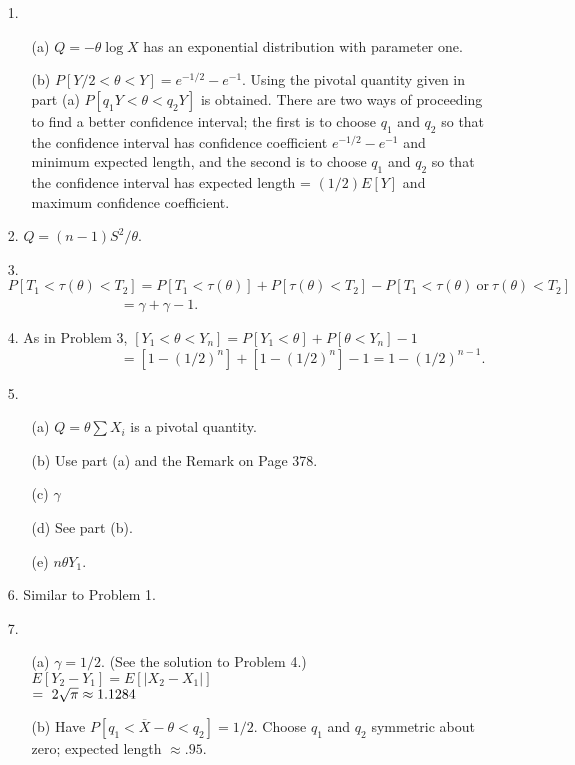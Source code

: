 \begin{enumerate}
	\item[1.] \begin{enumerate}
		\item[(a)] $Q=-\theta\log X$ has an exponential distribution with parameter one.
		\item[(b)] $P[Y/2 <\theta <Y] = e^{-1/2}-e^{-1}$. Using the pivotal quantity given in part (a) $P[q_1Y < \theta < q_2Y]$ is obtained.  There are two ways of proceeding to find a better confidence interval; the first is to choose $q_1$ and $q_2$ so that the confidence interval has confidence coefficient $e^{-1/2}-e^{-1}$ and minimum expected length, and the second is to choose $q_1$ and $q_2$ so that the confidence interval has expected length = $(1/2)E[Y]$ and maximum confidence coefficient.
	\end{enumerate}
	
	\item[2.] $Q=(n-1)S^2/\theta$.
	
	\item[3.] $P[T_1 < \tau(\theta) < T_2] = P[T_1 < \tau(\theta)] + P[\tau(\theta) < T_2] - P[T_1<\tau(\theta)\ \mbox{or}\ \tau(\theta) < T_2]$ \\
	${}\qquad\qquad\qquad\qquad = \gamma + \gamma -1$.
	
	\item[4.] As in Problem 3, $[Y_1 < \theta < Y_n] = P[Y_1 < \theta] + P[\theta < Y_n] - 1$\\
	${}\qquad\qquad\qquad\qquad = [1-(1/2)^n] + [1-(1/2)^n] -1 = 1 - (1/2)^{n-1}$.
	
	\item[5.] \begin{enumerate}
		\item[(a)] $Q= \theta\sum X_i$ is a pivotal quantity.
		\item[(b)] Use part (a) and the Remark on Page 378.
		\item[(c)] $\gamma$
		\item[(d)] See part (b).
		\item[(e)] $n\theta Y_1$.
	\end{enumerate}

	\item[6.] Similar to Problem 1.

	\item[7.] \begin{enumerate}
		\item[(a)] $\gamma=1/2$. (See the solution to Problem 4.) $E[Y_2-Y_1]=E[\vert X_2-X_1\vert]$ \\
		$=\ 2\/\sqrt{\pi} \approx 1.1284$
		\item[(b)] Have $P[q_1 < \overline{X}-\theta < q_2] = 1/2$. Choose $q_1$ and $q_2$ symmetric about zero; expected length $\approx .95$.
	\end{enumerate}


\end{enumerate}
